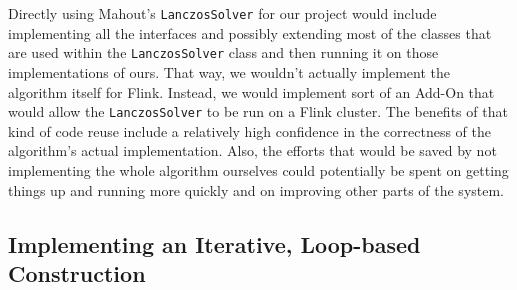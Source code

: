 
Directly using Mahout's \texttt{LanczosSolver} for our project would include implementing all
the interfaces and possibly extending most of the classes that are used within the
\texttt{LanczosSolver} class and then running it on those implementations of ours. That way, we
wouldn't actually implement the algorithm itself for Flink. Instead, we would implement sort of
an Add-On that would allow the \texttt{LanczosSolver} to be run on a Flink cluster. The benefits
of that kind of code reuse include a relatively high confidence in the correctness of the
algorithm's actual implementation. Also, the efforts that would be saved by not implementing the
whole algorithm ourselves could potentially be spent on getting things up and running more
quickly and on improving other parts of the system.

\subsection{Implementing an Iterative, Loop-based Construction}




